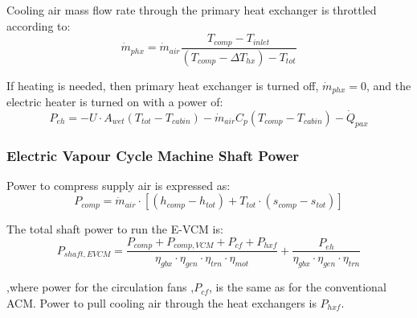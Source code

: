 \documentclass[english]{kththesis}
\begin{document}
Cooling air mass flow rate through the primary heat exchanger is throttled according to:
\begin{equation}
\label{VCMphxThrottled}
\dot{m}_{phx} = \dot{m}_{air} \frac{T_{comp}-T_{inlet}}{(T_{comp}-\Delta T_{hx})-T_{tot}}
\end{equation}

If heating is needed, then primary heat exchanger is turned off, $\dot{m}_{phx}=0$, and the electric heater is turned on with a power of:
\begin{equation}
\label{VCMPeh}
P_{eh} = -U\cdot A_{wet} (T_{tot}-T_{cabin}) - \dot{m}_{air} C_p (T_{comp}-T_{cabin}) - \dot{Q}_{pax}
\end{equation}


\subsubsection{Electric Vapour Cycle Machine Shaft Power}
\label{subsubsec:EVCMShaftPower}
Power to compress supply air is expressed as:
\begin{equation}
\label{eq:EVCMPcomp}
P_{comp} = \dot{m}_{air} \cdot \left[ (h_{comp}-h_{tot}) + T_{tot} \cdot (s_{comp}-s_{tot}) \right]
\end{equation}

The total shaft power to run the E-VCM is:
\begin{equation}
\label{eq:EVCMPshaft}
P_{shaft,EVCM} = \frac{P_{comp} + P_{comp,VCM} + P_{cf} +  P_{hxf}}{\eta_{gbx} \cdot \eta_{gen} \cdot \eta_{trn} \cdot \eta_{mot}} + \frac{P_{eh}}{\eta_{gbx} \cdot \eta_{gen} \cdot \eta_{trn}}
\end{equation}

,where power for the circulation fans ,$P_{cf}$, is the same as for the conventional ACM. Power to pull cooling air through the heat exchangers is $P_{hxf}$.
\end{document}
